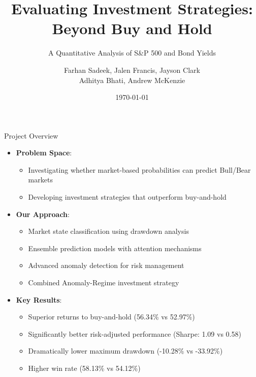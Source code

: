 \documentclass[aspectratio=169,xcolor=dvipsnames]{beamer}
\title{Evaluating Investment Strategies: Beyond Buy and Hold}
\subtitle{A Quantitative Analysis of S\&P 500 and Bond Yields}
\author{Farhan Sadeek, Jalen Francis, Jayson Clark \texorpdfstring{\\}{,} Adhitya Bhati, Andrew McKenzie}
\institute
{
    Department of Mathematics \\
    The Ohio State University %
}
\date{\today} %
\begin{document}
\begin{frame}
    \titlepage
\end{frame}

\begin{frame}{Project Overview}
    \begin{itemize}
        \item \textbf{Problem Space}:
              \begin{itemize}
                  \item Investigating whether market-based probabilities can predict Bull/Bear markets
                  \item Developing investment strategies that outperform buy-and-hold
              \end{itemize}
        \item \textbf{Our Approach}:
              \begin{itemize}
                  \item Market state classification using drawdown analysis
                  \item Ensemble prediction models with attention mechanisms
                  \item Advanced anomaly detection for risk management
                  \item Combined Anomaly-Regime investment strategy
              \end{itemize}
        \item \textbf{Key Results}:
              \begin{itemize}
                  \item Superior returns to buy-and-hold (56.34\% vs 52.97\%)
                  \item Significantly better risk-adjusted performance (Sharpe: 1.09 vs 0.58)
                  \item Dramatically lower maximum drawdown (-10.28\% vs -33.92\%)
                  \item Higher win rate (58.13\% vs 54.12\%)
              \end{itemize}
    \end{itemize}
\end{frame}
\end{document}
